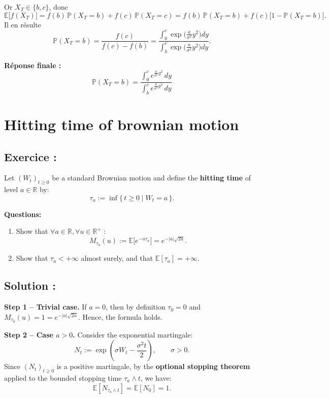 Or $X_T\in\{b,c\}$, donc
\[
\mathbb{E}\big[f(X_T)\big]=f(b)\,\mathbb{P}(X_T=b)+f(c)\,\mathbb{P}(X_T=c)
     =f(b)\,\mathbb{P}(X_T=b)+f(c)\bigl[1-\mathbb{P}(X_T=b)\bigr].
\]
Il en résulte
\[
\mathbb{P}(X_T=b)
= \frac{f(c)}{f(c)-f(b)}
= \frac{\displaystyle\int_0^c \exp\!\bigl(\tfrac{a}{\sigma^2} y^2\bigr)dy}
       {\displaystyle\int_b^c \exp\!\bigl(\tfrac{a}{\sigma^2} y^2\bigr)dy}.
\]

\medskip
\textbf{Réponse finale :}
\[
\boxed{\;
\mathbb{P}(X_T = b)
= \frac{\displaystyle\int_0^{c} e^{\frac{a}{\sigma^{2}} y^{2}}\,dy}
       {\displaystyle\int_{b}^{c} e^{\frac{a}{\sigma^{2}} y^{2}}\,dy}
\;}
\]


\section{Hitting time of brownian motion}

\subsection*{Exercice :}

\begin{exerciseBox}
Let \( (W_t)_{t \ge 0} \) be a standard Brownian motion and define the \textbf{hitting time} of level \( a \in \mathbb{R} \) by:
\[
\tau_a := \inf\{\, t \ge 0 \mid W_t = a \,\}.
\]

\textbf{Questions:}
\begin{enumerate}
  \item Show that $\forall a \in \mathbb{R}, \forall u \in \mathbb{R}^{+}$ :
    \[
    M_{\tau_a}(u) := \mathbb{E}\big[e^{-u \tau_a}\big] = e^{-|a| \sqrt{2u}}.
    \]
  \item Show that \( \tau_a < +\infty \) almost surely, and that \( \mathbb{E}[\tau_a] = +\infty. \)   
\end{enumerate}
\end{exerciseBox}

\subsection*{Solution :}


\textbf{Step 1 – Trivial case.}  
If \( a = 0 \), then by definition \( \tau_0 = 0 \) and \( M_{\tau_0}(u) = 1 = e^{-|a|\sqrt{2u}} \).  
Hence, the formula holds.

\medskip
\textbf{Step 2 – Case \( a > 0 \).}  
Consider the exponential martingale:
\[
N_t := \exp\!\left( \sigma W_t - \frac{\sigma^2 t}{2} \right), \qquad \sigma > 0.
\]
Since \( (N_t)_{t \ge 0} \) is a positive martingale, by the \textbf{optional stopping theorem} applied to the bounded stopping time \( \tau_a \wedge t \), we have:
\[
\mathbb{E}[N_{\tau_a \wedge t}] = \mathbb{E}[N_0] = 1.
\]

